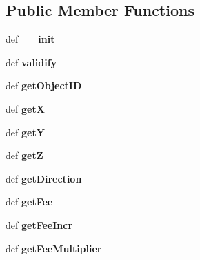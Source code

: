 \subsection*{Public Member Functions}
\begin{CompactItemize}
\item 
\hypertarget{classGameObject_1_1Portal_a1adc7f3fdb62ab8c27c70c1a8b3a703}{
def \textbf{\_\-\_\-init\_\-\_\-}}
\label{classGameObject_1_1Portal_a1adc7f3fdb62ab8c27c70c1a8b3a703}

\item 
\hypertarget{classGameObject_1_1Portal_46b36b978c86507377aec9dee9fc1239}{
def \textbf{validify}}
\label{classGameObject_1_1Portal_46b36b978c86507377aec9dee9fc1239}

\item 
\hypertarget{classGameObject_1_1Portal_580a57bb97d42af10459975de71fb499}{
def \textbf{getObjectID}}
\label{classGameObject_1_1Portal_580a57bb97d42af10459975de71fb499}

\item 
\hypertarget{classGameObject_1_1Portal_c359af216f892f72e8ba6ca96a6fd102}{
def \textbf{getX}}
\label{classGameObject_1_1Portal_c359af216f892f72e8ba6ca96a6fd102}

\item 
\hypertarget{classGameObject_1_1Portal_ae4cc2521dcaefc577b70085b7b810d2}{
def \textbf{getY}}
\label{classGameObject_1_1Portal_ae4cc2521dcaefc577b70085b7b810d2}

\item 
\hypertarget{classGameObject_1_1Portal_e442927b4806e1a98d690973f6ce1c30}{
def \textbf{getZ}}
\label{classGameObject_1_1Portal_e442927b4806e1a98d690973f6ce1c30}

\item 
\hypertarget{classGameObject_1_1Portal_e73b144974cf2f0a2fbb9a1122f83b99}{
def \textbf{getDirection}}
\label{classGameObject_1_1Portal_e73b144974cf2f0a2fbb9a1122f83b99}

\item 
\hypertarget{classGameObject_1_1Portal_19d3642e7f1d6575eb922316c72b51b4}{
def \textbf{getFee}}
\label{classGameObject_1_1Portal_19d3642e7f1d6575eb922316c72b51b4}

\item 
\hypertarget{classGameObject_1_1Portal_b13eb65ac9bf026d8d766359ded62572}{
def \textbf{getFeeIncr}}
\label{classGameObject_1_1Portal_b13eb65ac9bf026d8d766359ded62572}

\item 
\hypertarget{classGameObject_1_1Portal_d492840ebf3cea7299010d2dbe051c4a}{
def \textbf{getFeeMultiplier}}
\label{classGameObject_1_1Portal_d492840ebf3cea7299010d2dbe051c4a}

\end{CompactItemize}
